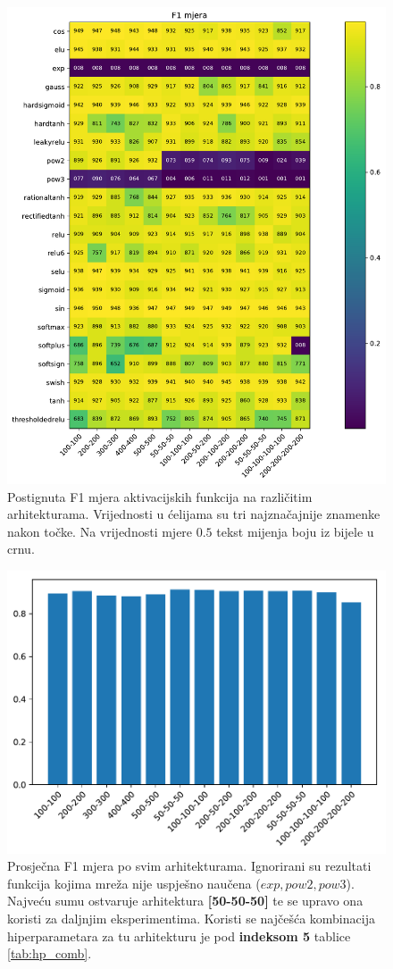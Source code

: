 \documentclass[times, utf8, numeric, diplomski]{fer}
\begin{document}
\begin{figure}[ht]
\includegraphics[width=\textwidth]{greedy_9_f1.pdf}
\centering
\caption{Postignuta F1 mjera aktivacijskih funkcija na različitim arhitekturama. Vrijednosti u ćelijama su tri najznačajnije znamenke nakon točke. Na vrijednosti mjere $0.5$ tekst mijenja boju iz bijele u crnu.}
\label{fig:greedy_9_f1}
\end{figure}

\begin{figure}[ht]
\includegraphics[width=.8\textwidth]{greedy_9_arch_quality.pdf}
\centering
\caption{Prosječna F1 mjera po svim arhitekturama. Ignorirani su rezultati funkcija kojima mreža nije uspješno naučena ($exp,pow2,pow3$). Najveću sumu ostvaruje arhitektura \textbf{[50-50-50]} te se upravo ona koristi za daljnjim eksperimentima. Koristi se najčešća kombinacija hiperparametara za tu arhitekturu je pod \textbf{indeksom 5} tablice \ref{tab:hp_comb}.}
\label{fig:greedy_9_arch_quality}
\end{figure}
\end{document}

